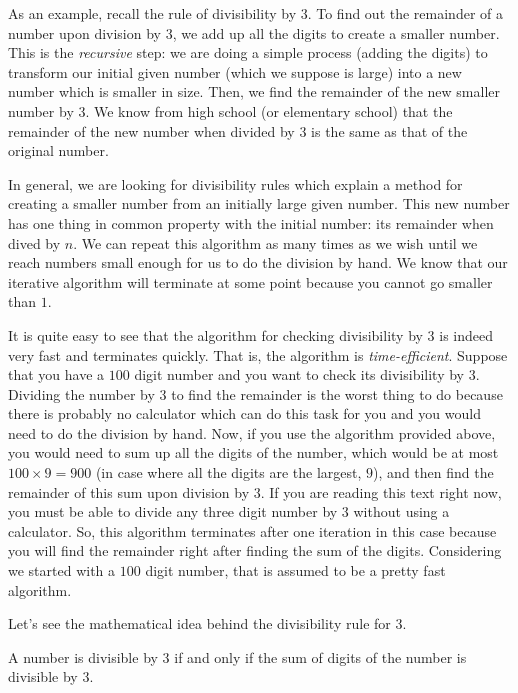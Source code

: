 \documentclass{subfile}
\begin{document}
As an example, recall the rule of divisibility by $3$. To find out the remainder of a number upon division by $3$, we add up all the digits to create a smaller number. This is the \textit{recursive} step: we are doing a simple process (adding the digits) to transform our initial given number (which we suppose is large) into a new number which is smaller in size. Then, we find the remainder of the new smaller number by $3$. We know from high school (or elementary school) that the remainder of the new number when divided by $3$ is the same as that of the original number.

In general, we are looking for divisibility rules which explain a method for creating a smaller number from an initially large given number. This new number has one thing in common property with the initial number: its remainder when dived by $n$. We can repeat this algorithm as many times as we wish until we reach numbers small enough for us to do the division by hand. We know that our iterative algorithm will terminate at some point because you cannot go smaller than $1$.

It is quite easy to see that the algorithm for checking divisibility by $3$ is indeed very fast and terminates quickly. That is, the algorithm is \textit{time-efficient}. Suppose that you have a $100$ digit number and you want to check its divisibility by $3$. Dividing the number by $3$ to find the remainder is the worst thing to do because there is probably no calculator which can do this task for you and you would need to do the division by hand. Now, if you use the algorithm provided above, you would need to sum up all the digits of the number, which would be at most $100 \times 9 = 900$ (in case where all the digits are the largest, $9$), and then find the remainder of this sum upon division by $3$. If you are reading this text right now, you must be able to divide any three digit number by $3$ without using a calculator. So, this algorithm terminates after one iteration in this case because you will find the remainder right after finding the sum of the digits. Considering we started with a $100$ digit number, that is assumed to be a pretty fast algorithm.

Let's see the mathematical idea behind the divisibility rule for $3$.


	\begin{proposition}[Divisibility by $3$]
		A number is divisible by $3$ if and only if the sum of digits of the number is divisible by $3$.
	\end{proposition}
\end{document}
